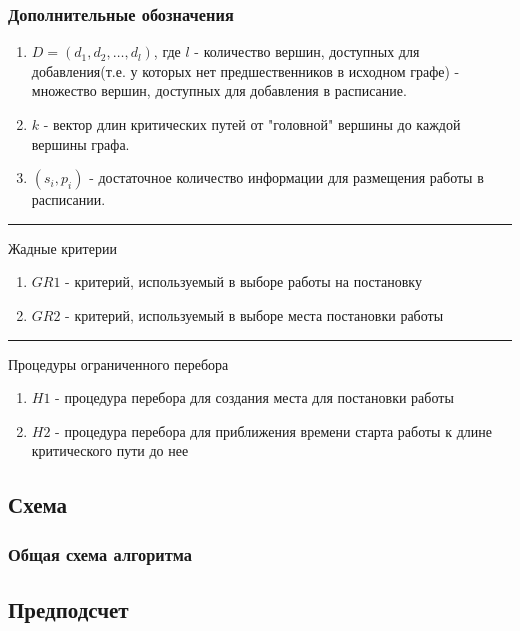 \documentclass[hyperref=unicode, aspectratio=169]{beamer}
\begin{document}
\begin{frame}
    \frametitle{Дополнительные обозначения}
    \begin{enumerate}
        \item $D= \left( d_1, d_2, \dots, d_l \right)$, где $l$ - количество вершин, доступных для добавления(т.е. у которых нет предшественников в исходном графе) - множество вершин, доступных для добавления в расписание.
        \item $k$ - вектор длин критических путей от "головной" вершины до каждой вершины графа.
        \item $\left( s_i, p_i \right)$ - достаточное количество информации для размещения работы в расписании.
    \end{enumerate}
    \hrule
    \vspace{2pt}
    Жадные критерии
    \begin{enumerate}
        \item $GR1$ - критерий, используемый в выборе работы на постановку
        \item $GR2$ - критерий, используемый в выборе места постановки работы
    \end{enumerate}
    \hrule
    \vspace{2pt}
    Процедуры ограниченного перебора
    \begin{enumerate}
        \item $H1$ - процедура перебора для создания места для постановки работы
        \item $H2$ - процедура перебора для приближения времени старта работы к длине критического пути до нее
    \end{enumerate}
\end{frame}

\subsection{Схема}
\begin{frame}
    \frametitle{Общая схема алгоритма}
    {\tiny
    }
\end{frame}

\subsection{Предподсчет}

\end{document}
